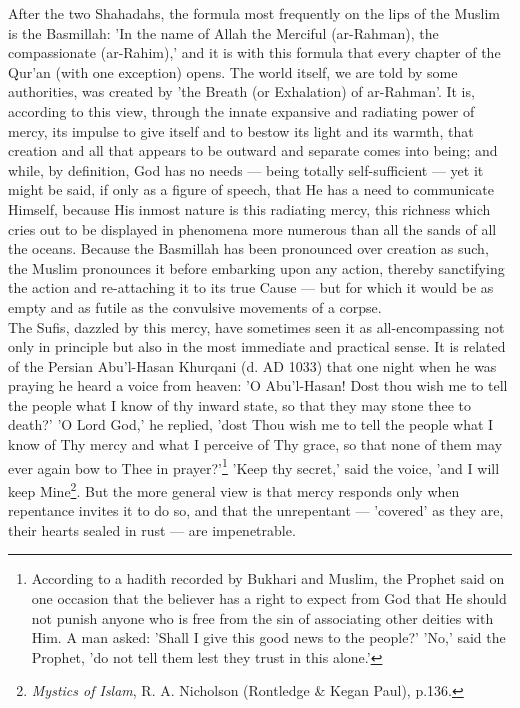 \documentclass[11pt, b5paper, twoside]{book}
\begin{document}
After the two Shahadahs, the formula most frequently on the lips of the Muslim is the Basmillah: 'In 
the name of Allah the Merciful (ar-Rahman), the compassionate (ar-Rahim),' and it is with this 
formula that every chapter of the Qur'an (with one exception) opens. The world itself, we are told by 
some authorities, was created by 'the Breath (or Exhalation) of ar-Rahman'. It is, according to this 
view, through the innate expansive and radiating power of mercy, its impulse to give itself and to 
bestow its light and its warmth, that creation and all that appears to be outward and separate comes 
into being; and while, by definition, God has no needs --- being totally self-sufficient --- yet it might 
be said, if only as a figure of speech, that He has a need to communicate Himself, because His inmost 
nature is this radiating mercy, this richness which cries out to be displayed in phenomena more 
numerous than all the sands of all the oceans. Because the Basmillah has been pronounced over 
creation as such, the Muslim pronounces it before embarking upon any action, thereby sanctifying the 
action and re-attaching it to its true Cause --- but for which it would be as empty and as futile as 
the convulsive movements of a corpse. \\

The Sufis, dazzled by this mercy, have sometimes seen it as all\hyp{}encompassing not only in principle 
but also in the most immediate and practical sense. It is related of the Persian Abu'l-Hasan Khurqani 
(d. AD 1033) that one night when he was praying he heard a voice from heaven: 'O Abu'l-Hasan! Dost 
thou wish me to tell the people what I know of thy inward state, so that they may stone thee to 
death?' 'O Lord God,' he replied, 'dost Thou wish me to tell the people what I know of Thy mercy and 
what I perceive of Thy grace, so that none of them may ever again bow to Thee in prayer?'\footnote{According to a hadith recorded by Bukhari and Muslim, the Prophet said on one occasion that the believer has a right to expect from God that He should not punish anyone who is free from the sin of associating other deities with Him. A man asked: 'Shall I give this good news to the people?' 'No,' 
said the Prophet, 'do not tell them lest they trust in this alone.'} 'Keep thy secret,' said the voice, 'and I will keep Mine\footnote{\emph{Mystics of Islam}, R. A. Nicholson (Rontledge \& Kegan Paul), p.136.}. But the more general view is that mercy responds only when repentance invites it to do so, and that the unrepentant --- 'covered' as they are, their hearts sealed in rust --- are impenetrable. \\
\end{document}
